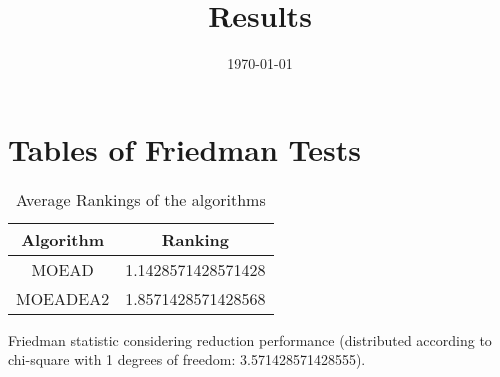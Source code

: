 \documentclass{article}
\title{Results}
\author{}
\date{\today}
\begin{document}
\oddsidemargin 0in \topmargin 0in\maketitle
\section{Tables of Friedman Tests}
\begin{table}[!htp]
\centering
\caption{Average Rankings of the algorithms
}\begin{tabular}{c|c}
Algorithm&Ranking\\
\hline
MOEAD&1.1428571428571428\\
MOEADEA2&1.8571428571428568\\
\end{tabular}
\end{table}


Friedman statistic considering reduction performance (distributed according to chi-square with 1 degrees of freedom: 3.571428571428555).
\end{document}
